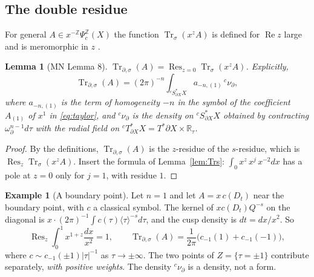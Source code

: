 \documentclass[11pt,oneside,reqno]{article}
\DeclareMathOperator{\Tr}{Tr}
\DeclareMathOperator{\Res}{Res}
\newcommand{\R}{\mathbb R}
\newcommand{\Z}{\mathbb Z}
\newcommand{\Psic}{\Psi_{c}}
\newcommand{\Trs}{\Tr_\sigma}
\newcommand{\Trds}{\Tr_{\partial,\sigma}}
\newcommand{\Zb}{{}^cS^*_{\partial X}X}
\theoremstyle{plain}
\newtheorem{lemma}[theorem]{Lemma}
\theoremstyle{definition}
\newtheorem{example}[theorem]{Example}
\theoremstyle{remark}
\begin{document}
\subsection{The double residue}
For general \(A\in x^{-\Z}\Psic^{\Z}(X)\) the function \(\Trs(x^zA)\) is
defined for \(\operatorname{Re}z\) large and is meromorphic in \(z\)
\cite[(52)]{MN}.

\begin{lemma}[MN Lemma 8]\label{lem:Trdsformula}
\(\Trds(A)=\Res_{z=0}\Trs(x^zA)\). Explicitly,
\[
 \Trds(A)=(2\pi)^{-n}\int_{\Zb}a_{-n,(1)}\,{}^c\nu_\partial ,
\]
where \(a_{-n,(1)}\) is the term of homogeneity \(-n\) in the symbol of
the coefficient \(A_{(1)}\) of \(x^1\) in \eqref{eq:taylor}, and
\({}^c\nu_\partial\) is the density on \(\Zb\) obtained by contracting
\(\omega_\partial^{n-1}d\tau\) with the radial field on
\({}^cT^*_{\partial X}X=T^*\partial X\times\R_\tau\).
\end{lemma}

\begin{proof}
By the definitions, \(\Trds(A)\) is the \(z\)-residue of the \(s\)-residue,
which is \(\Res_z\Trs(x^zA)\). Insert the formula of Lemma~\ref{lem:Trs}:
\(\int_0x^{z}\,x^j\,x^{-2}dx\) has a pole at \(z=0\) only for \(j=1\), with
residue \(1\).
\end{proof}

\begin{example}[A boundary point]\label{ex:Trdspoint}
Let \(n=1\) and let \(A=x\,c(D_t)\) near the boundary point, with
\(c\) a classical symbol. The kernel of \(xc(D_t)Q^{-s}\) on the diagonal
is \(x\cdot(2\pi)^{-1}\int c(\tau)\langle\tau\rangle^{-s}d\tau\), and the
cusp density is \(dt=dx/x^2\). So
\[
 \Res_z\int_0^1x^{1+z}\frac{dx}{x^2}=1,\qquad
 \Trds(A)=\frac1{2\pi}\bigl(c_{-1}(1)+c_{-1}(-1)\bigr),
\]
where \(c\sim c_{-1}(\pm1)|\tau|^{-1}\) as \(\tau\to\pm\infty\). The two
points of \(Z=\{\tau=\pm1\}\) contribute separately, \emph{with positive
weights}. The density \({}^c\nu_\partial\) is a density, not a form.
\end{example}
\end{document}
